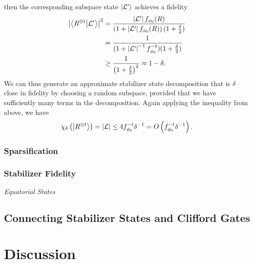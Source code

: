 then the corresponding subspace state $\ket{\mathcal{L'}}$ achieves a fidelity
\begin{align}
\left|\braket{R^{\otimes t}}{\mathcal{L'}}\right|^{2}&=\frac{\left|\mathcal{L'}\right|f_{\phi_{0}}(R)}{\left(1+\left|\mathcal{L'}\right|f_{\phi_{0}}(R)\right)(1+\frac{\delta}{2})}\nonumber \\
&= \frac{1}{(1+\left|\mathcal{L'}\right|^{-1}f_{\phi_{0}}^{-t})(1+\frac{\delta}{2})} \nonumber \\
&\geq \frac{1}{\left(1+\frac{\delta}{2}\right)^{2}} \approx 1 - \delta.
\label{eq:clifford_fidelity}
\end{align}
We can thus generate an approximate stabilizer state decomposition that is $\delta$ close in fidelity by choosing a random subspace, provided that we have sufficiently many terms in the decomposition. Again applying the inequality from above, we have
\begin{equation}
\chi_{\delta}\left(\ket{R^{\otimes t}}\right) = \left|\mathcal{L}\right| \leq 4 f_{\phi_{0}}^{-t}\delta^{-1}=O\left(f_{\phi_{0}}^{-t}\delta^{-1}\right).
\label{eq:clifford_approx_rank}
\end{equation}
\subsubsection*{Sparsification}
\subsubsection*{Stabilizer Fidelity}
\par
\large{\itshape{Equatorial States}}
\subsection{Connecting Stabilizer States and Clifford Gates}
\section{Discussion}\label{sec:srank_discussion}

